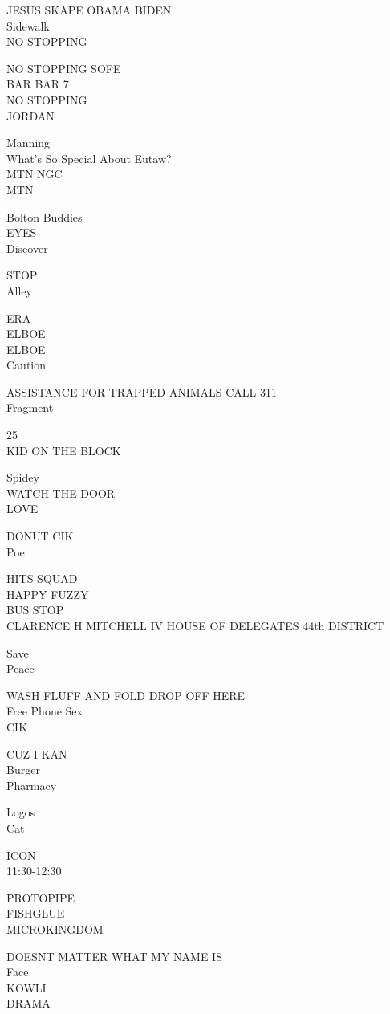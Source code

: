 \documentclass[10pt,letterpaper]{article}
\begin{document}
JESUS SKAPE OBAMA BIDEN\\
Sidewalk\\
NO STOPPING

NO STOPPING SOFE\\
BAR BAR 7\\
NO STOPPING\\
JORDAN

Manning\\
What's So Special About Eutaw?\\
MTN NGC\\
MTN

Bolton Buddies\\
EYES\\
Discover

STOP\\
Alley

ERA\\
ELBOE\\
ELBOE\\
Caution

ASSISTANCE FOR TRAPPED ANIMALS CALL 311\\
Fragment

25\\
KID ON THE BLOCK

Spidey\\
WATCH THE DOOR\\
LOVE

DONUT CIK\\
Poe

HITS SQUAD\\
HAPPY FUZZY\\
BUS STOP\\
CLARENCE H MITCHELL IV HOUSE OF DELEGATES 44th DISTRICT

Save\\
Peace

WASH FLUFF AND FOLD DROP OFF HERE\\
Free Phone Sex\\
CIK

CUZ I KAN\\
Burger\\
Pharmacy

Logos\\
Cat

ICON\\
11:30{-}12:30

PROTOPIPE\\
FISHGLUE\\
MICROKINGDOM

DOESNT MATTER WHAT MY NAME IS\\
Face\\
KOWLI\\
DRAMA
\end{document}
